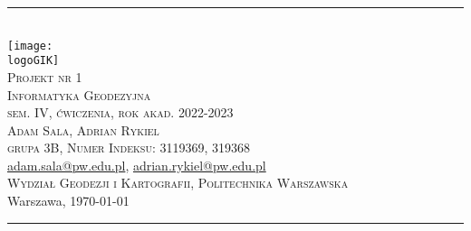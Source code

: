 \documentclass[10pt,a4paper]{article}
\makeatletter
\newcommand{\logoGIK}{settings/WGiK-znak.png}
\newcommand{\authorName}{Adam Sala, Adrian Rykiel  \\ grupa 3B, Numer Indeksu: 3119369, 319368}
\newcommand{\titeReport}{Projekt nr 1} %
\newcommand{\titleLecture}{Informatyka Geodezyjna \\ sem. IV, ćwiczenia, rok akad. 2022-2023} %
\newcommand{\mymail}{\href{mailto:adam.sala@pw.edu.pl}{adam.sala@pw.edu.pl}}
\newcommand{\mymaillll}{\href{mailto:aadrian.rykiel@pw.edu.pl}{adrian.rykiel@pw.edu.pl}}
\newcommand{\faculty}{Wydział Geodezji i Kartografii}
\newcommand{\university}{Politechnika Warszawska}
\newcommand{\city}{Warszawa}
\makeatother
\begin{document}
\begin{center} 
\rule{\textwidth}{.5pt} \\
\vspace{1.0cm}
    \texttt{[image: \\logoGIK]}
\vspace{0.5cm} \\
	\Large \textsc{\titeReport}
\vspace{0.5cm} \\  
	\large \textsc{\titleLecture}
\vspace{0.5cm}\\
	\textsc{\authorName}  \\
	\mymail, \mymaillll \\
	\textsc{\faculty}, \textsc{\university}  \\ 
	 \city, \today
\end{center} 
\rule{\textwidth}{1.5pt}

\tableofcontents 								%
\newpage





\end{document}
